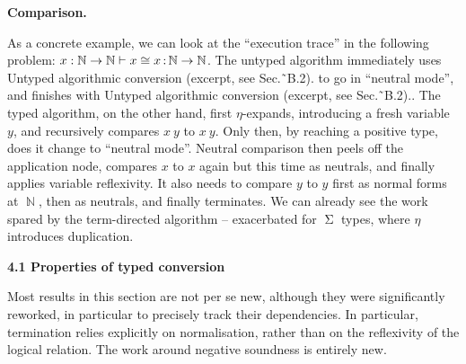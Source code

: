  
 
\par\medskip\noindent\textbf{Comparison.}\par
 
 
As a concrete example, we can look at the “execution trace” in the following problem: $x:\operatorname{\mathbb{N}}\to\operatorname{\mathbb{N}}\vdash x\mathrel{%
\raisebox{-0.5pt}{$\cong$}}x\operatorname{\mathrel{:}}\operatorname{\mathbb{N}%
}\to\operatorname{\mathbb{N}}$. The untyped algorithm immediately uses   Untyped algorithmic conversion (excerpt, see Sec.˜B.2). to go in “neutral mode”, and finishes with   Untyped algorithmic conversion (excerpt, see Sec.˜B.2).. The typed algorithm, on the other hand, first $\eta$-expands, introducing a fresh variable $y$, and recursively compares $x\ y$ to $x\ y$. Only then, by reaching a positive type, does it change to “neutral mode”. Neutral comparison then peels off the application node, compares $x$ to $x$ again but this time as neutrals, and finally applies variable reflexivity. It also needs to compare $y$ to $y$ first as normal forms at $\operatorname{\mathbb{N}}$, then as neutrals, and finally terminates. We can already see the work spared by the term-directed algorithm – exacerbated for $\operatorname{\Sigma}$ types, where $\eta$ introduces duplication.\par
 
 
 


 
\par\medskip\noindent\textbf{4.1 Properties of typed conversion}\par
 
 
Most results in this section are not per se new, although they were significantly reworked, in particular to precisely track their dependencies. In particular, termination relies explicitly on normalisation, rather than on the reflexivity of the logical relation. The work around negative soundness is entirely new.\par
 
 
 
